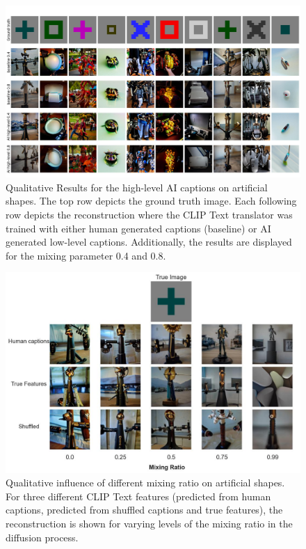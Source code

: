 \begin{figure}[H]
   \centering
   \includegraphics[width=1\textwidth]{plots/aicap_qual_art_highlevel_appendix.JPEG}
   \caption[Experiment 2: Reconstructed images for Brain-Diffuser on artificial shapes with high-level captions]{Qualitative Results for the high-level AI captions on artificial shapes. The top row depicts the ground truth image. Each following row depicts the reconstruction where the CLIP Text translator was trained with either human generated captions (baseline) or AI generated low-level captions. Additionally, the results are displayed for the mixing parameter 0.4 and 0.8.}\label{fig:aicap_qual_art_highlevel_appendix}
\end{figure}


\begin{figure}[H]
   \centering
   \includegraphics[width=1\textwidth]{plots/aicap_reconstruction_evolution_art_0.JPEG}
   \caption[Influence of the mixing ratio on artificial shapes]{Qualitative influence of different mixing ratio on artificial shapes. For three different CLIP Text features (predicted from human captions, predicted from shuffled captions and true features), the reconstruction is shown for varying levels of the mixing ratio in the diffusion process.}\label{fig:aicap_reconstruction_evolution_art_0}
\end{figure}

